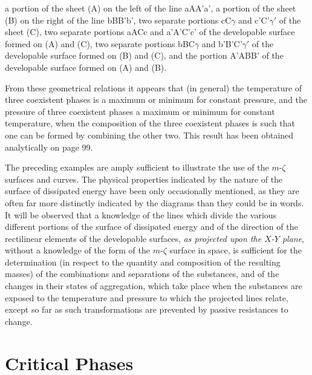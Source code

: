 \documentclass[11pt]{article}
\begin{document}
a portion of the sheet (A) on the left of the line aAA'a', a portion of the sheet (B) on the right of the line bBB'b', two separate portions cC$\gamma$ and c'C'$\gamma'$ of the sheet (C), two separate portions aACc and a'A'C'c' of the developable surface formed on (A) and (C), two separate portions bBC$\gamma$ and b'B'C'$\gamma'$ of the developable surface formed on (B) and (C), and the portion A'ABB' of the developable surface formed on (A) and (B).

From these geometrical relations it appears that (in general) the temperature of three coexistent phases is a maximum or minimum for constant pressure, and the pressure of three coexistent phases a maximum or minimum for constant temperature, when the composition of the three coexistent phases is such that one can be formed by combining the other two. This result has been obtained analytically on page 99.

The preceding examples are amply sufficient to illustrate the use of the $m$-$\zeta$ surfaces and curves. The physical properties indicated by the nature of the surface of dissipated energy have been only occasionally mentioned, as they are often far more distinctly indicated by the diagrams than they could be in words. It will be observed that a knowledge of the lines which divide the various different portions of the surface of dissipated energy and of the direction of the rectilinear elements of the developable surfaces, \emph{as projected upon the $X$-$Y$ plane}, without a knowledge of the form of the $m$-$\zeta$ surface in space, is sufficient for the determination (in respect to the quantity and composition of the resulting masses) of the combinations and separations of the substances, and of the changes in their states of aggregation, which take place when the substances are exposed to the temperature and pressure to which the projected lines relate, except so far as such transformations are prevented by passive resistances to change.

\section*{Critical Phases}
\end{document}

